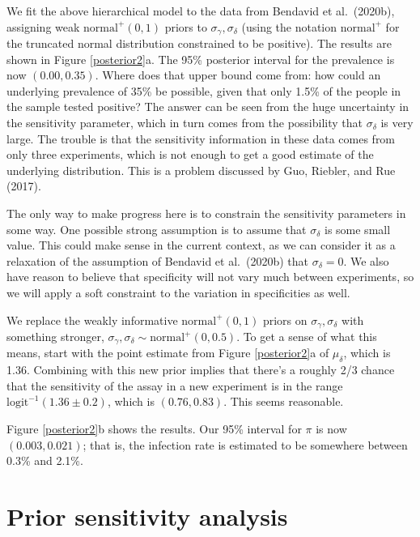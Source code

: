 \documentclass[11pt]{article}
\begin{document}
We  fit the above hierarchical model to the data from Bendavid et al.\ (2020b), assigning weak $\mbox{normal}^+(0,1)$ priors to $\sigma_{\gamma},\sigma_{\delta}$ (using the notation $\mbox{normal}^+$ for the truncated normal distribution constrained to be positive).  The results are shown in Figure \ref{posterior2}a.  The 95\% posterior interval for the prevalence is now $(0.00, 0.35)$.  Where does that upper bound come from:  how could an underlying prevalence of 35\% be possible, given that only 1.5\% of the people in the sample tested positive?  The answer can be seen from the huge uncertainty in the sensitivity parameter, which in turn comes from the possibility that $\sigma_{\delta}$ is very large.  The trouble is that the sensitivity information in these data comes from only three experiments, which is not enough to get a good estimate of the underlying distribution.  This is a problem discussed by Guo, Riebler, and Rue (2017).

The only way to make progress here is to constrain the sensitivity parameters in some way.  One possible strong assumption is to assume that $\sigma_{\delta}$ is some small value.  This could make sense in the current context, as we can consider it as a relaxation of the assumption of Bendavid et al.\ (2020b) that $\sigma_{\delta} = 0$.  We also have reason to believe that specificity will not vary much between experiments, so we will apply a soft constraint to the variation in specificities as well.

We replace the weakly informative $\mbox{normal}^+(0, 1)$ priors on $\sigma_{\gamma},\sigma_{\delta}$ with something stronger,
$\sigma_{\gamma}, \sigma_{\delta}\sim\mbox{normal}^+(0, 0.5)$.  To get a sense of what this means, start with the point estimate from Figure \ref{posterior2}a of $\mu_{\delta}$, which is 1.36. Combining with this new prior implies that there's a roughly 2/3 chance that the sensitivity of the assay in a new experiment is in the range $\mbox{logit}^{-1}(1.36 \pm 0.2)$, which is $(0.76, 0.83)$. This seems reasonable.

Figure \ref{posterior2}b shows the results.  Our 95\% interval for $\pi$ is now $(0.003, 0.021)$; that is, the infection rate is estimated to be somewhere between 0.3\% and 2.1\%.

\section{Prior sensitivity analysis}
\end{document}
